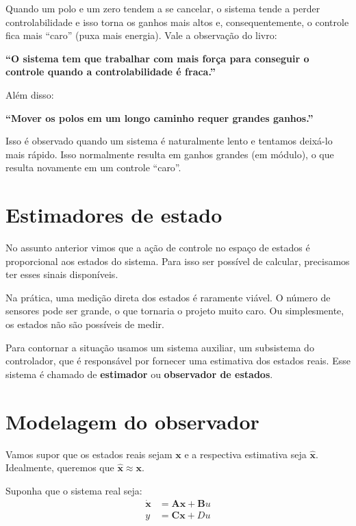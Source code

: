 \documentclass[
]{book}
\begin{document}
Quando um polo e um zero tendem a se cancelar, o sistema tende a perder
controlabilidade e isso torna os ganhos mais altos e, consequentemente,
o controle fica mais ``caro'' (puxa mais energia). Vale a observação do
livro:

\textbf{``O sistema tem que trabalhar com mais força para conseguir o controle
quando a controlabilidade é fraca.''}

Além disso:

\textbf{``Mover os polos em um longo caminho requer grandes ganhos.''}

Isso é observado quando um sistema é naturalmente lento e tentamos
deixá-lo mais rápido. Isso normalmente resulta em ganhos grandes (em
módulo), o que resulta novamente em um controle ``caro''.

\hypertarget{estimadores-de-estado}{%
\section{Estimadores de estado}\label{estimadores-de-estado}}

No assunto anterior vimos que a ação de controle no espaço de estados é
proporcional aos estados do sistema. Para isso ser possível de calcular,
precisamos ter esses sinais disponíveis.

Na prática, uma medição direta dos estados é raramente viável. O número
de sensores pode ser grande, o que tornaria o projeto muito caro. Ou
simplesmente, os estados não são possíveis de medir.

Para contornar a situação usamos um sistema auxiliar, um subsistema do
controlador, que é responsável por fornecer uma estimativa dos estados
reais. Esse sistema é chamado de \textbf{estimador} ou \textbf{observador de
estados}.

\hypertarget{modelagem-do-observador}{%
\section{Modelagem do observador}\label{modelagem-do-observador}}

Vamos supor que os estados reais sejam \(\mathbf{x}\) e a respectiva
estimativa seja \(\hat{\mathbf{x}}\). Idealmente, queremos que
\(\hat{\mathbf{x}}\approx \mathbf{x}\).

Suponha que o sistema real seja: \[
\begin{align*}
    \dot{\mathbf{x}} &= \mathbf{Ax+B}u\\
    y &= \mathbf{Cx} + Du
\end{align*}
\]
\end{document}
